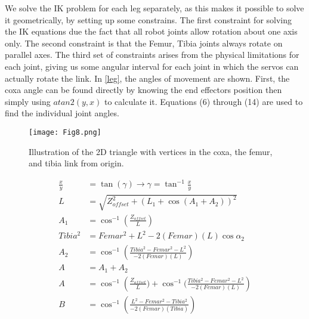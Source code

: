We solve the IK problem for each leg separately, as this makes it possible to solve it geometrically, by setting up some constrains. The first constraint for solving the IK equations due the fact that all robot joints allow rotation about one axis only. The second constraint is that the Femur, Tibia joints always rotate on parallel axes. The third set of constraints arises from the physical limitations for each joint, giving us some angular interval for each joint in which the servos can actually rotate the link. In \ref{leg}, the angles of movement are shown.
First, the coxa angle can be found directly by knowing the end effectors position then simply using $atan2(y,x)$ to calculate it. Equations (6) through (14) are used to find the individual joint angles.
\begin{figure}[h]
	\centering
	\texttt{[image: Fig8.png]}
	\caption{ Illustration of the 2D triangle with vertices in the coxa, the femur, and tibia link from origin.}
	\label{fig8}
\end{figure}

\begin{align}
    \frac{x}{y} & =\tan (\gamma)\to \gamma =\tan ^{-1}\frac{x}{y} \\
    L              & = \sqrt{Z_{offset}^{2}+(L_{1}+\cos (A_1 + A_2))^{2}}\\
    A_{1}        & = \cos ^{-1}(\frac{Z_{offset}}{L})\\
    Tibia^{2}  & =Femar^{2}+L^{2}-2(Femar)(L)\cos \alpha _{2} \\
    A_{2} & =\cos^{-1}(\frac{Tibia^{2}-Femar^{2}-L^{2}}{-2(Femar)(L)}) \\
    A & =A_{1} + A_{2}\\
    A & = \cos ^{-1}\left(\frac{Z_{offset}}{L})+\cos ^{-1}(\frac{Tibia^{2}-Femar^{2}-L^{2}}{-2(Femar)(L)}\right) \\
    B & = \cos^{-1}\left(\frac{L^{2}-Femar^{2}-Tibia^{2}}{-2(Femar)(Tibia)}\right)
\end{align}